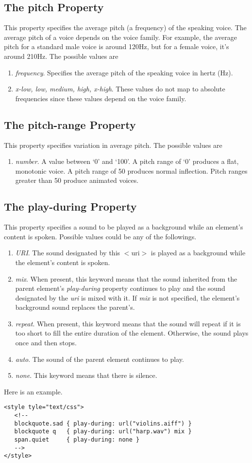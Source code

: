 \documentclass[a4paper,oneside]{book}
\numberwithin{equation}{chapter}
\begin{document}
\subsection{The pitch Property}
This property specifies the average pitch (a frequency) of the speaking voice. The average pitch of a voice depends on the voice family. For example, the average pitch for a standard male voice is around 120Hz, but for a female voice, it's around 210Hz. The possible values are
\begin{enumerate}
\item \textit{frequency}. Specifies the average pitch of the speaking voice in hertz (Hz).
\item \textit{x-low, low, medium, high, x-high}. These values do not map to absolute frequencies since these values depend on the voice family.
\end{enumerate}
\subsection{The pitch-range Property}
This property specifies variation in average pitch. The possible values are
\begin{enumerate}
\item \textit{number}. A value between `0' and `100'. A pitch range of `0' produces a flat, monotonic voice. A pitch range of 50 produces normal inflection. Pitch ranges greater than 50 produce animated voices.
\end{enumerate}
\subsection{The play-during Property}
This property specifies a sound to be played as a background while an element's content is spoken. Possible values could be any of the followings.
\begin{enumerate}
\item \textit{URI}. The sound designated by this $<$uri$>$ is played as a background while the element's content is spoken.
\item \textit{mix}. When present, this keyword means that the sound inherited from the parent element's \textit{play-during} property continues to play and the sound designated by the \textit{uri} is mixed with it. If \textit{mix} is not specified, the element's background sound replaces the parent's.
\item \textit{repeat}. When present, this keyword means that the sound will repeat if it is too short to fill the entire duration of the element. Otherwise, the sound plays once and then stops.
\item \textit{auto}. The sound of the parent element continues to play.
\item \textit{none}. This keyword means that there is silence.
\end{enumerate}
Here is an example.
\begin{verbatim}
<style tyle="text/css">
   <!--
   blockquote.sad { play-during: url("violins.aiff") }
   blockquote q   { play-during: url("harp.wav") mix }
   span.quiet     { play-during: none }
   -->
</style>
\end{verbatim}
\end{document}
